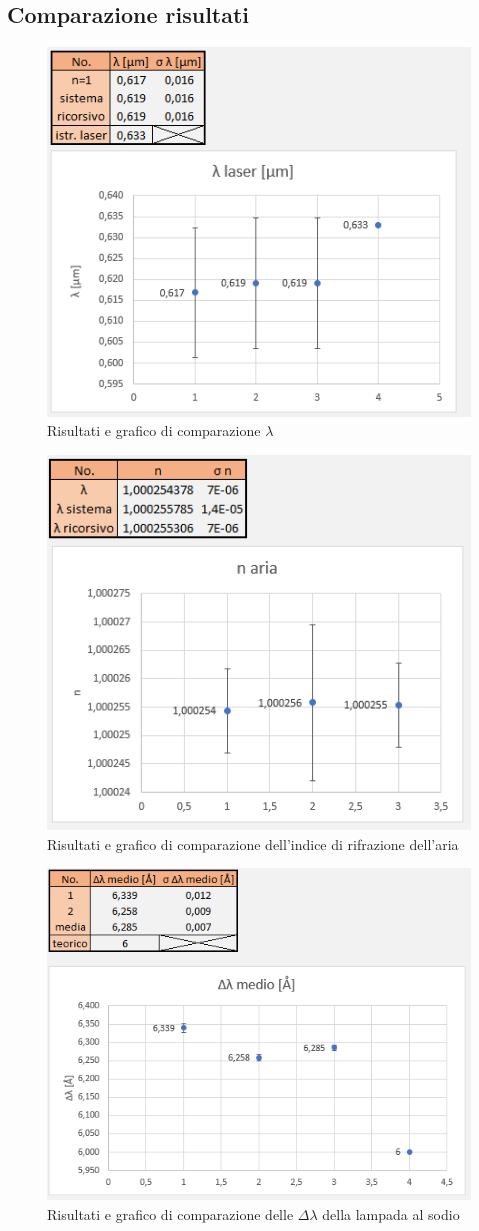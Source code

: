 \documentclass{article}
\begin{document}
\pagebreak

\subsection{Comparazione risultati}

\begin{figure}[h!]
  \centering
  \includegraphics[width=0.6\linewidth]{IM comparazione lambda}
  \caption{Risultati e grafico di comparazione $\lambda$}
\end{figure}

\begin{figure}[h!]
  \centering
  \includegraphics[width=0.6\linewidth]{IM comparazione n}
  \caption{Risultati e grafico di comparazione dell'indice di rifrazione dell'aria}
\end{figure}

\begin{figure}[h!]
  \centering
  \includegraphics[width=0.6\linewidth]{IM comparazione delta lambda}
  \caption{Risultati e grafico di comparazione delle $\Delta\lambda$ della lampada al sodio}
\end{figure}
\end{document}
